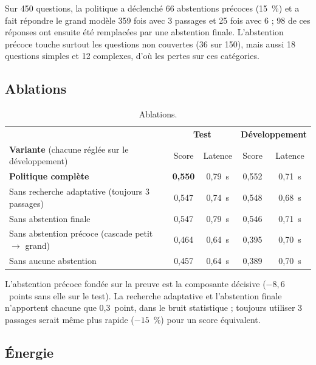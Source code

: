 \documentclass[11pt,a4paper]{article}
\begin{document}
Sur 450 questions, la politique a déclenché 66 abstentions précoces (15~\%) et a fait répondre le grand
modèle 359 fois avec 3 passages et 25 fois avec 6 ; 98 de ces réponses ont ensuite été remplacées par
une abstention finale. L'abstention précoce touche surtout les questions non couvertes (36 sur 150), mais
aussi 18 questions simples et 12 complexes, d'où les pertes sur ces catégories.

\subsection{Ablations}

\begin{table}[H]
\centering\small
\begin{tabular}{l c c c c}
\toprule
& \multicolumn{2}{c}{\textbf{Test}} & \multicolumn{2}{c}{\textbf{Développement}} \\
\textbf{Variante} (chacune réglée sur le développement) & Score & Latence & Score & Latence \\
\midrule
\textbf{Politique complète} & \textbf{0,550} & 0,79~s & 0,552 & 0,71~s \\
Sans recherche adaptative (toujours 3 passages) & 0,547 & 0,74~s & 0,548 & 0,68~s \\
Sans abstention finale & 0,547 & 0,79~s & 0,546 & 0,71~s \\
Sans abstention précoce (cascade petit $\to$ grand) & 0,464 & 0,64~s & 0,395 & 0,70~s \\
Sans aucune abstention & 0,457 & 0,64~s & 0,389 & 0,70~s \\
\bottomrule
\end{tabular}
\caption{Ablations.}
\label{tab:ablations}
\end{table}

L'abstention précoce fondée sur la preuve est la composante décisive ($-8{,}6$~points sans elle sur le
test). La recherche adaptative et l'abstention finale n'apportent chacune que 0,3~point, dans le bruit
statistique ; toujours utiliser 3 passages serait même plus rapide ($-15$~\%) pour un score équivalent.

\subsection{Énergie}
\end{document}
